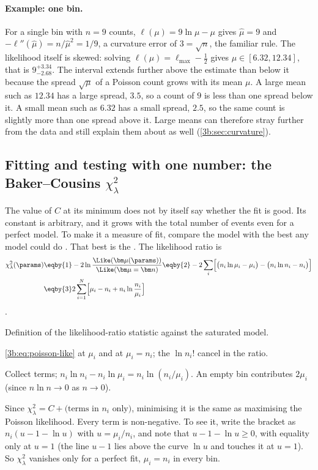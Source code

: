 \paragraph{Example: one bin.}
For a single bin with $n=9$ counts,
$\ell(\mu)=9\ln\mu-\mu$ gives $\hat\mu=9$ and
$-\ell''(\hat\mu)=n/\hat\mu^2=1/9$, a curvature error of $3=\sqrt n$, the
familiar rule. The likelihood itself is skewed: solving
$\ell(\mu)=\ell_{\max}-\tfrac12$ gives $\mu\in[6.32,12.34]$, that is
$9^{+3.34}_{-2.68}$. The interval extends further above the estimate than below it because
the spread $\sqrt\mu$ of a Poisson count grows with its mean $\mu$. A large mean such as
$12.34$ has a large spread, $3.5$, so a count of $9$ is less than one spread
below it. A small mean such as $6.32$ has a small spread, $2.5$, so the
same count is slightly more than one spread above it. Large means can
therefore stray further from the data and still explain them about as well
(\cref{3b:sec:curvature}).

\subsection{Fitting and testing with one number: the Baker--Cousins \texorpdfstring{$\chi^2_\lambda$}{chi2-lambda}}
\label{3b:sec:baker-cousins}

The value of $C$ at its minimum does not by itself say whether the fit is
good. Its constant is arbitrary, and it grows with the total number of
events even for a perfect model. To make it a measure of fit, compare the
model with the best any model could do \cite{BakerCousins1984}. That best
is the 
. The likelihood ratio is
\begin{align}
  \chi^2_\lambda(\params)
  &\eqby{1}-2\ln\frac{\Like(\bm\mu(\params))}{\Like(\bm\mu=\bm n)}
  \eqby{2}-2\sum_i\Bigl[\bigl(n_i\ln\mu_i-\mu_i\bigr)-\bigl(n_i\ln n_i-n_i\bigr)\Bigr]
  \nonumber\\
  &\eqby{3}2\sum_{i=1}^N\Bigl[\mu_i-n_i+n_i\ln\frac{n_i}{\mu_i}\Bigr]
  \label{3b:eq:baker-cousins}
\end{align}
.
\begin{explain}
  \item Definition of the likelihood-ratio statistic against the saturated
        model.
  \item \eqref{3b:eq:poisson-like} at $\mu_i$ and at $\mu_i=n_i$; the
        $\ln n_i!$ cancel in the ratio.
  \item Collect terms; $n_i\ln n_i-n_i\ln\mu_i=n_i\ln(n_i/\mu_i)$.
        An empty bin contributes $2\mu_i$ (since $n\ln n\to0$ as $n\to0$).
\end{explain}
Since $\chi^2_\lambda=C+\text{(terms in $n_i$ only)}$, minimising it is the
same as maximising the Poisson likelihood. Every term is non-negative. To
see it, write the bracket as $n_i(u-1-\ln u)$ with $u=\mu_i/n_i$, and note
that $u-1-\ln u\ge0$, with equality only at $u=1$ (the line $u-1$ lies above
the curve $\ln u$ and touches it at $u=1$). So $\chi^2_\lambda$ vanishes
only for a perfect fit, $\mu_i=n_i$ in every bin.

